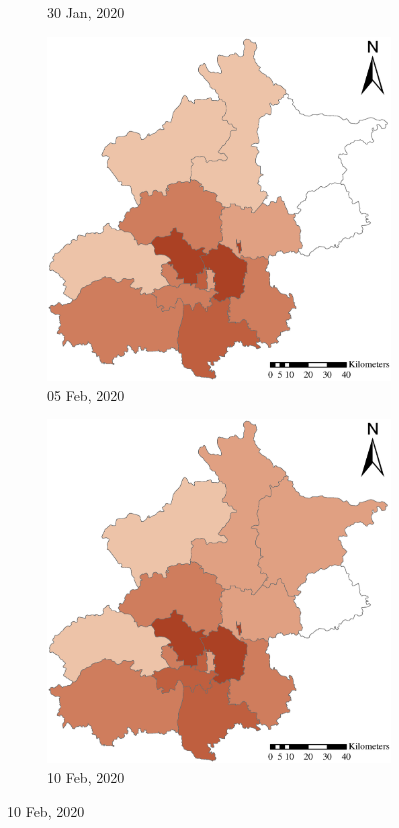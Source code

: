 \documentclass[preprints,article,accept,moreauthors,pdftex]{Definitions/mdpi}
\begin{document}
\begin{figure}[ht]
\begin{subfigure}{.23\textwidth}
        \caption{30 Jan, 2020}
    \end{subfigure}
    \begin{subfigure}{.23\textwidth}
        \includegraphics[width=\textwidth]{Figures/ConfirmedDistrictD2020_02_05.eps}
        \caption{05 Feb, 2020}
    \end{subfigure}
    \begin{subfigure}{.23\textwidth}
        \includegraphics[width=\textwidth]{Figures/ConfirmedDistrictD2020_02_10.eps}
        \caption{10 Feb, 2020}
    \end{subfigure}


\end{figure}
\end{document}
